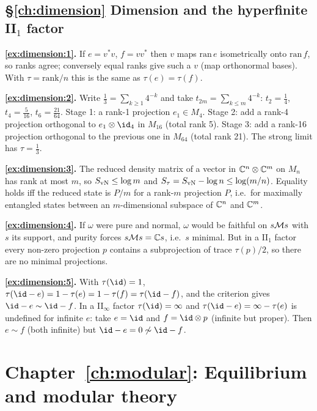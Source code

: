 {\subsection*{\S\ref{ch:dimension} Dimension and the hyperfinite II$_1$ factor}
\textbf{\ref{ex:dimension:1}.} If $e=v^*v$, $f=vv^*$ then $v$ maps $\mathrm{ran}\,e$ isometrically onto $\mathrm{ran}\,f$, so ranks agree; conversely equal ranks give such a $v$ (map orthonormal bases). With $\tau=\mathrm{rank}/n$ this is the same as $\tau(e)=\tau(f)$.\par
\textbf{\ref{ex:dimension:2}.} Write $\frac13=\sum_{k\ge1}4^{-k}$ and take $t_{2m}=\sum_{k\le m}4^{-k}$: $t_2=\frac14$, $t_4=\frac5{16}$, $t_6=\frac{21}{64}$. Stage 1: a rank-1 projection $e_1\in M_4$. Stage 2: add a rank-4 projection orthogonal to $e_1\otimes\id_4$ in $M_{16}$ (total rank 5). Stage 3: add a rank-16 projection orthogonal to the previous one in $M_{64}$ (total rank 21). The strong limit has $\tau=\frac13$.\par
\textbf{\ref{ex:dimension:3}.} The reduced density matrix of a vector in $\mathbb{C}^n\otimes\mathbb{C}^m$ on $M_n$ has rank at most $m$, so $S_{\rm vN}\le\log m$ and $S_\tau=S_{\rm vN}-\log n\le\log(m/n)$. Equality holds iff the reduced state is $P/m$ for a rank-$m$ projection $P$, i.e.\ for maximally entangled states between an $m$-dimensional subspace of $\mathbb{C}^n$ and $\mathbb{C}^m$.\par
\textbf{\ref{ex:dimension:4}.} If $\omega$ were pure and normal, $\omega$ would be faithful on $s\mathcal{M} s$ with $s$ its support, and purity forces $s\mathcal{M} s=\mathbb{C} s$, i.e.\ $s$ minimal. But in a II$_1$ factor every non-zero projection $p$ contains a subprojection of trace $\tau(p)/2$, so there are no minimal projections.\par
\textbf{\ref{ex:dimension:5}.} With $\tau(\id)=1$, $\tau(\id-e)=1-\tau(e)=1-\tau(f)=\tau(\id-f)$, and the criterion gives $\id-e\sim\id-f$. In a II$_\infty$ factor $\tau(\id)=\infty$ and $\tau(\id-e)=\infty-\tau(e)$ is undefined for infinite $e$: take $e=\id$ and $f=\id\otimes p$ (infinite but proper). Then $e\sim f$ (both infinite) but $\id-e=0\not\sim\id-f$.\par

\section*{Chapter~\ref{ch:modular}: Equilibrium and modular theory}

}
